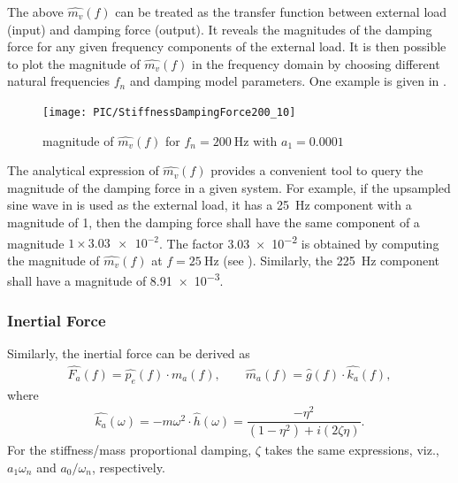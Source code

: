 The above $\hat{m_v}\left(f\right)$ can be treated as the transfer function between external load (input) and damping force (output). It reveals the magnitudes of the damping force for any given frequency components of the external load. It is then possible to plot the magnitude of $\hat{m_v}\left(f\right)$ in the frequency domain by choosing different natural frequencies $f_n$ and damping model parameters. One example is given in .
\begin{figure}[htb!]
\centering
\texttt{[image: PIC/StiffnessDampingForce200\_10]}
\caption{magnitude of $\hat{m_v}\left(f\right)$ for $f_n=\SI{200}{\hertz}$ with $a_1=0.0001$}\label{fig:k_proportional_damping}
\end{figure}
The analytical expression of $\hat{m_v}\left(f\right)$ provides a convenient tool to query the magnitude of the damping force in a given system. For example, if the upsampled sine wave in  is used as the external load, it has a \SI{25}{\hertz} component with a magnitude of \num{1}, then the damping force shall have the same component of a magnitude $1\times\num{3.03e-2}$. The factor \num{3.03e-2} is obtained by computing the magnitude of $\hat{m_v}\left(f\right)$ at $f=\SI{25}{\hertz}$ (see ). Similarly, the \SI{225}{\hertz} component shall have a magnitude of \num{8.91e-3}.
\subsubsection{Inertial Force}
Similarly, the inertial force can be derived as
\begin{gather}
\hat{F_a}\left(f\right)=\hat{p_e}\left(f\right)\cdot\hat{m_a}\left(f\right),\qquad
\hat{m_a}\left(f\right)=\hat{g}\left(f\right)\cdot\hat{k_a}\left(f\right),
\end{gather}
where
\begin{gather}\label{eq:inertial_force}
\hat{k_a}\left(\omega\right)=-m\omega^2\cdot\hat{h}\left(\omega\right)=\dfrac{-\eta^2}{\left(1-\eta^2\right)+i\left(2\zeta\eta\right)}.
\end{gather}
For the stiffness/mass proportional damping, $\zeta$ takes the same expressions, viz., $a_1\omega_n$ and $a_0/\omega_n$, respectively.
